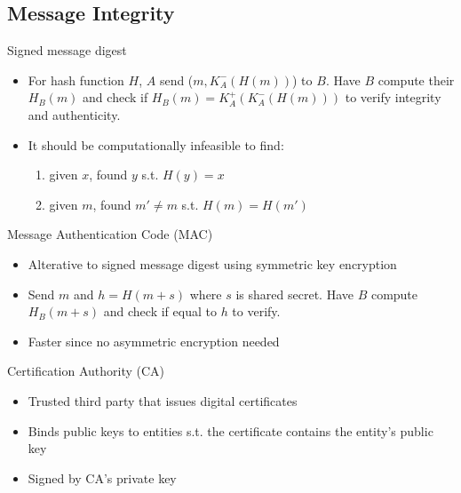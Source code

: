 \subsection{Message Integrity}

\begin{definition}
    {Signed message digest}

    \begin{itemize}
        \item For hash function $H$, $A$ send ($m, K_A^-(H(m))$) to $B$. Have $B$ compute their $H_B(m)$ and check if $H_B(m) = K_A^+(K_A^-(H(m)))$ to verify integrity and authenticity.

        \item It should be computationally infeasible to find:
              \begin{enumerate}
                  \item given $x$, found $y$ s.t. $H(y) = x$
                  \item given $m$, found $m' \neq m$ s.t. $H(m) = H(m')$
              \end{enumerate}
    \end{itemize}
\end{definition}

\begin{definition}
    {Message Authentication Code (MAC)}
    \begin{itemize}
        \item Alterative to signed message digest using symmetric key encryption
        \item Send $m$ and $h=H(m+s)$ where $s$ is shared secret. Have $B$ compute $H_B(m+s)$ and check if equal to $h$ to verify.
        \item Faster since no asymmetric encryption needed
    \end{itemize}
\end{definition}

\begin{definition}
    {Certification Authority (CA)}
    \begin{itemize}
        \item Trusted third party that issues digital certificates
        \item Binds public keys to entities s.t. the certificate contains the entity's public key
        \item Signed by CA's private key
    \end{itemize}
\end{definition}

